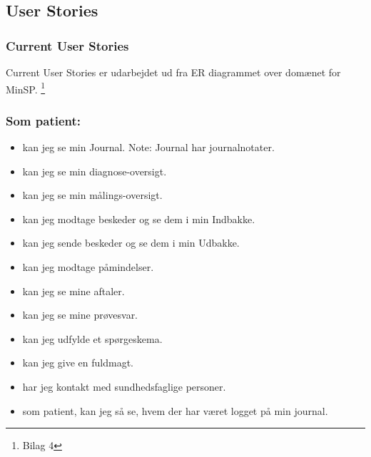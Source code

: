 %
%
%
%
%
%
\subsection{User Stories}
\subsubsection{Current User Stories} %
Current User Stories er udarbejdet ud fra ER diagrammet over domænet for MinSP. \footnote{Bilag 4} 
\subsubsection*{Som patient:}
\begin{itemize}
\item kan jeg se min Journal. Note: Journal har journalnotater. 
\item kan jeg se min diagnose-oversigt.
\item kan jeg se min målings-oversigt.
\item kan jeg modtage beskeder og se dem i min Indbakke.
\item kan jeg sende beskeder og se dem i min Udbakke.
\item kan jeg modtage påmindelser.
\item kan jeg se mine aftaler. 
\item kan jeg se mine prøvesvar.
\item kan jeg udfylde et spørgeskema.
\item kan jeg give en fuldmagt. 
\item har jeg kontakt med sundhedsfaglige personer. 
\item som patient, kan jeg så se, hvem der har været logget på min journal.
\end{itemize}
